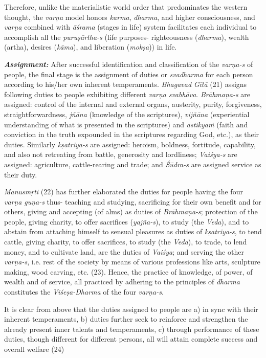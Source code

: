 Therefore, unlike the materialistic world order that predominates the western thought, the \emph{varṇa} model honors \emph{karma}, \emph{dharma}, and higher consciousness, and \emph{varṇa} combined with \emph{āśrama} (stages in life) system facilitates each individual to accomplish all the \emph{puruṣārtha-s} (life purposes- righteousness (\emph{dharma}), wealth (artha), desires (\emph{kāma}), and liberation (\emph{mokṣa})) in life.

\emph{\textbf{Assignment:}} After successful identification and classification of the \emph{varṇa-s} of people, the final stage is the assignment of duties or \emph{svadharma} for each person according to his/her own inherent temperaments. \emph{Bhagavad} \emph{Gītā} (21) assigns following duties to people exhibiting different \emph{varṇa} \emph{svabhāva}. \emph{Brāhmaṇa-s} are assigned: control of the internal and external organs, austerity, purity, forgiveness, straightforwardness, \emph{jñāna} (knowledge of the scriptures), \emph{vijñāna} (experiential understanding of what is presented in the scriptures) and \emph{āstikyaṁ} (faith and conviction in the truth expounded in the scriptures regarding God, etc.), as their duties. Similarly \emph{kṣatriya-s} are assigned: heroism, boldness, fortitude, capability, and also not retreating from battle, generosity and lordliness; \emph{Vaiśya-s} are assigned: agriculture, cattle-rearing and trade; and \emph{Śūdra-s} are assigned service as their duty.

\emph{Manusmṛti} (22) has further elaborated the duties for people having the four \emph{varṇa} \emph{guṇa-s} thus- teaching and studying, sacrificing for their own benefit and for others, giving and accepting (of alms) as duties of \emph{Brāhmaṇa-s}; protection of the people, giving charity, to offer sacrifices (\emph{yajña-s}), to study (the \emph{Veda}), and to abstain from attaching himself to sensual pleasures as duties of \emph{kṣatriya-s}, to tend cattle, giving charity, to offer sacrifices, to study (the \emph{Veda}), to trade, to lend money, and to cultivate land, are the duties of \emph{Vaiśya}; and serving the other \emph{varṇa-s}, i.e. rest of the society by means of various professions like arts, sculpture making, wood carving, etc. (23). Hence, the practice of knowledge, of power, of wealth and of service, all practiced by adhering to the principles of \emph{dharma} constitutes the \emph{Viśeṣa-Dharma} of the four \emph{varṇa-s}.

It is clear from above that the duties assigned to people are a) in sync with their inherent temperaments, b) duties further seek to reinforce and strengthen the already present inner talents and temperaments, c) through performance of these duties, though different for different persons, all will attain complete success and overall welfare (24)

